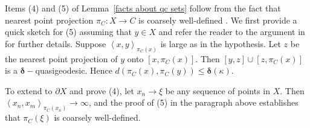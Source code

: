 \documentclass{amsart}
\numberwithin{equation}{section}
\theoremstyle{definition}
\newcommand{\gen}[1]{\left< #1 \right>}
\newcommand{\bdelta}{{\boldsymbol\delta}}
\begin{document}
Items (4) and (5) of  Lemma~\ref{facts about qc sets} follow from the fact that nearest point projection  $\pi_C: X \to C$ is coarsely well-defined \cite[Lemmas 3.1, 3.2]{mitra-trees}.
We first provide  a quick sketch for (5) assuming that $y \in X$ and refer the reader to the argument in \cite[Lemmas 3.1, 3.2]{mitra-trees} for further details.
Suppose
$\gen{x,y}_{\pi_C(x)}$ is large as in the hypothesis. Let $z$ be the nearest point projection of  $y$ onto $[x, \pi_C(x)]$. 
Then $[y,z]\cup [z, \pi_C(x)]$ is a $\bdelta-$quasigeodesic. 
Hence $d(\pi_C(x),\pi_C(y))\le \bdelta(\kappa)$. 

To extend to $\partial X$ and prove (4), let $x_n \to \xi$ be any sequence of points in $X$. Then $\gen{x_n,x_m}_{\pi_C(x_n)}\to \infty$, and the proof of (5) in the paragraph above establishes that $\pi_C(\xi)$
is coarsely well-defined.
\end{document}
